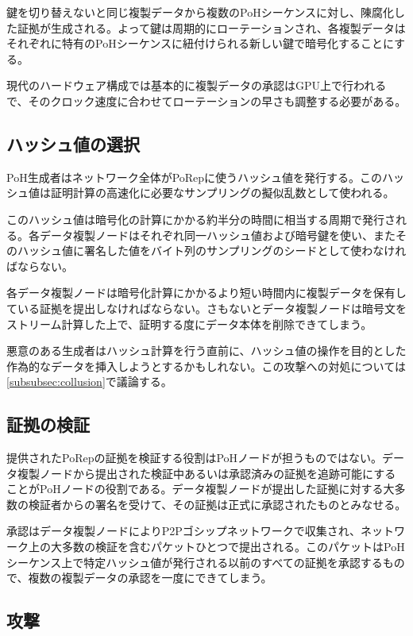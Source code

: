 \documentclass[12pt]{ltjsarticle}
\begin{document}
鍵を切り替えないと同じ複製データから複数のPoHシーケンスに対し、陳腐化した証拠が生成される。よって鍵は周期的にローテーションされ、各複製データはそれぞれに特有のPoHシーケンスに紐付けられる新しい鍵で暗号化することにする。

現代のハードウェア構成では基本的に複製データの承認はGPU上で行われるで、そのクロック速度に合わせてローテーションの早さも調整する必要がある。

\subsection{ハッシュ値の選択}\label{hashselection}

PoH生成者はネットワーク全体がPoRepに使うハッシュ値を発行する。このハッシュ値は証明計算の高速化に必要なサンプリングの擬似乱数として使われる。

このハッシュ値は暗号化の計算にかかる約半分の時間に相当する周期で発行される。各データ複製ノードはそれぞれ同一ハッシュ値および暗号鍵を使い、またそのハッシュ値に署名した値をバイト列のサンプリングのシードとして使わなければならない。

各データ複製ノードは暗号化計算にかかるより短い時間内に複製データを保有している証拠を提出しなければならない。さもないとデータ複製ノードは暗号文をストリーム計算した上で、証明する度にデータ本体を削除できてしまう。

悪意のある生成者はハッシュ計算を行う直前に、ハッシュ値の操作を目的とした作為的なデータを挿入しようとするかもしれない。この攻撃への対処については\ref{subsubsec:collusion}で議論する。

\subsection{証拠の検証}
提供されたPoRepの証拠を検証する役割はPoHノードが担うものではない。データ複製ノードから提出された検証中あるいは承認済みの証拠を追跡可能にすることがPoHノードの役割である。データ複製ノードが提出した証拠に対する大多数の検証者からの署名を受けて、その証拠は正式に承認されたものとみなせる。

承認はデータ複製ノードによりP2Pゴシップネットワークで収集され、ネットワーク上の大多数の検証を含むパケットひとつで提出される。このパケットはPoHシーケンス上で特定ハッシュ値が発行される以前のすべての証拠を承認するもので、複数の複製データの承認を一度にできてしまう。

\subsection{攻撃}
\end{document}
